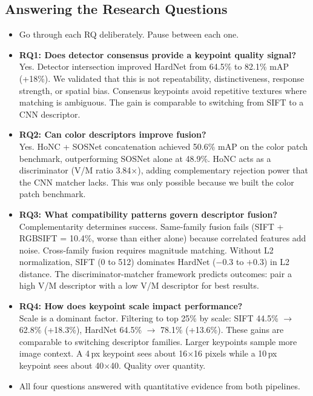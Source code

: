 \documentclass[11pt, letterpaper]{article}
\begin{document}
\subsection{Answering the Research Questions}
\begin{itemize}
  \item Go through each RQ deliberately. Pause between each one.

  \item \textbf{RQ1: Does detector consensus provide a keypoint quality signal?}\\
    Yes. Detector intersection improved HardNet from 64.5\% to 82.1\% mAP (+18\%). We validated that this is not repeatability, distinctiveness, response strength, or spatial bias. Consensus keypoints avoid repetitive textures where matching is ambiguous. The gain is comparable to switching from SIFT to a CNN descriptor.

  \item \textbf{RQ2: Can color descriptors improve fusion?}\\
    Yes. HoNC + SOSNet concatenation achieved 50.6\% mAP on the color patch benchmark, outperforming SOSNet alone at 48.9\%. HoNC acts as a discriminator (V/M ratio 3.84$\times$), adding complementary rejection power that the CNN matcher lacks. This was only possible because we built the color patch benchmark.

  \item \textbf{RQ3: What compatibility patterns govern descriptor fusion?}\\
    Complementarity determines success. Same-family fusion fails (SIFT + RGBSIFT = 10.4\%, worse than either alone) because correlated features add noise. Cross-family fusion requires magnitude matching. Without L2 normalization, SIFT (0 to 512) dominates HardNet ($-0.3$ to $+0.3$) in L2 distance. The discriminator-matcher framework predicts outcomes: pair a high V/M descriptor with a low V/M descriptor for best results.

  \item \textbf{RQ4: How does keypoint scale impact performance?}\\
    Scale is a dominant factor. Filtering to top 25\% by scale: SIFT 44.5\% $\to$ 62.8\% (+18.3\%), HardNet 64.5\% $\to$ 78.1\% (+13.6\%). These gains are comparable to switching descriptor families. Larger keypoints sample more image context. A 4\,px keypoint sees about 16$\times$16 pixels while a 10\,px keypoint sees about 40$\times$40. Quality over quantity.

  \item All four questions answered with quantitative evidence from both pipelines.
\end{itemize}
\end{document}
